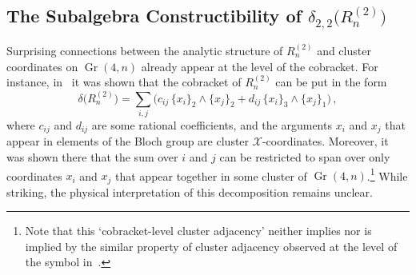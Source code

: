\documentclass[11pt]{article}
\DeclareMathOperator{\Gr}{Gr}
\def\x{\mathcal{X}}
\def\pdfeq#1{\texorpdfstring{$#1$}{a}}
\begin{document}
\subsection{The Subalgebra Constructibility of \pdfeq{\delta_{2,2}\big(R_n^{(2)} \big)}}

Surprising connections between the analytic structure of $R_n^{(2)}$\! and cluster coordinates on $\Gr(4,n)$ already appear at the level of the cobracket. For instance, in~\cite{Golden:2014pua} it was shown that the cobracket of $R_n^{(2)}$\! can be put in the form
\begin{equation} \label{eq:cobracket_decomp}
\delta\big(R^{(2)}_n\big) = \sum_{i,j} \Big(c_{ij} \, \{x_i\}_2 \wedge \{x_j\}_2 + d_{ij} \, \{x_i\}_3 \wedge \{x_j\}_1 \Big) \, ,
\end{equation}
where $c_{ij}$ and $d_{ij}$ are some rational coefficients, and the arguments $x_i$ and $x_j$ that appear in elements of the Bloch group are cluster $\x$-coordinates. Moreover, it was shown there that the sum over $i$ and $j$ can be restricted to span over only coordinates $x_i$ and $x_j$ that appear together in some cluster of $\Gr(4,n)$.\footnote{Note that this `cobracket-level cluster adjacency' neither implies nor is implied by the similar property of cluster adjacency observed at the level of the symbol in~\cite{Drummond:2017ssj}.} While striking, the physical interpretation of this decomposition remains unclear.
\end{document}
